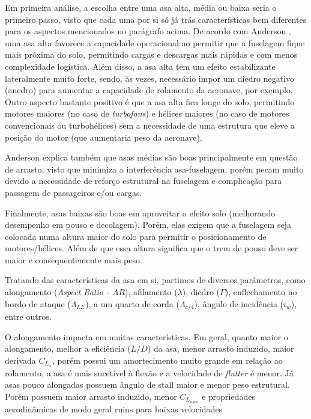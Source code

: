 Em primeira análise, a escolha entre uma asa alta, média ou baixa seria o primeiro passo, visto que cada uma por si só já trás características bem diferentes para os aspectos mencionados no parágrafo acima. De acordo com Anderson \cite{anderson1999}, uma asa alta favorece a capacidade operacional ao permitir que a fuselagem fique mais próxima do solo, permitindo cargas e descargas mais rápidas e com menos complexidade logística. Além disso, a asa alta tem um efeito estabilizante lateralmente muito forte, sendo, às vezes, necessário impor um diedro negativo (anedro) para aumentar a capacidade de rolamento da aeronave, por exemplo. Outro aspecto bastante positivo é que a asa alta fica longe do solo, permitindo motores maiores (no caso de \textit{turbofans}) e hélices maiores (no caso de motores convencionais ou turbohélices) sem a necessidade de uma estrutura que eleve a posição do motor (que aumentaria peso da aeronave).

Anderson \cite{anderson1999} explica também que asas médias são boas principalmente em questão de arrasto, visto que minimiza a interferência asa-fuselagem, porém pecam muito devido a necessidade de reforço estrutural na fuselagem e complicação para passagem de passageiros e/ou cargas.

Finalmente, asas baixas são boas em aproveitar o efeito solo (melhorando desempenho em pouso e decolagem). Porém, elas exigem que a fuselagem seja colocada numa altura maior do solo para permitir o posicionamento de motores/hélices. Além de que essa altura significa que o trem de pouso deve ser maior e consequentemente mais peso. \cite{anderson1999}

Tratando das características da asa em si, partimos de diversos parâmetros, como alongamento (\textit{Aspect Ratio - $AR$}), afilamento ($\lambda$), diedro ($\Gamma$), enflechamento no bordo de ataque ($\Lambda_{LE}$), a um quarto de corda ($\Lambda_{c/4}$), ângulo de incidência ($i_w$), entre outros.

O alongamento impacta em muitas características. Em geral, quanto maior o alongamento, melhor a eficiência ($L/D$) da asa, menor arrasto induzido, maior derivada $C_{L_\alpha}$, porém possui um amortecimento muito grande em relação ao rolamento, a asa é mais sucetível à flexão e a velocidade de \textit{flutter} é menor. Já asas pouco alongadas possuem ângulo de stall maior e menor peso estrutural. Porém possuem maior arrasto induzido, menor $C_{L_{max}}$ e propriedades aerodinâmicas de modo geral ruins para baixas velocidades \cite{gudmundsson2021}

